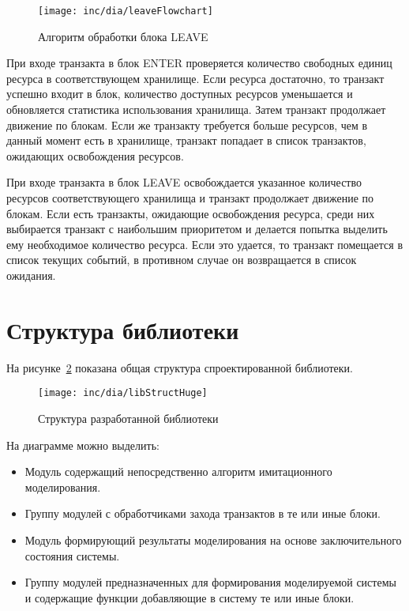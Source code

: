 \begin{figure}[ht!]
  \centering
  \texttt{[image: inc/dia/leaveFlowchart]}
  \caption{Алгоритм обработки блока LEAVE}
  \label{fig:leaveFlowchart}
\end{figure}

При входе транзакта в блок ENTER проверяется количество свободных единиц ресурса в соответствующем хранилище. Если ресурса достаточно, то транзакт успешно входит в блок, количество доступных ресурсов уменьшается и обновляется статистика использования хранилища. Затем транзакт продолжает движение по блокам. Если же транзакту требуется больше ресурсов, чем в данный момент есть в хранилище, транзакт попадает в список транзактов, ожидающих освобождения ресурсов.

При входе транзакта в блок LEAVE освобождается указанное количество ресурсов соответствующего хранилища и транзакт продолжает движение по блокам. Если есть транзакты, ожидающие освобождения ресурса, среди них выбирается транзакт с наибольшим приоритетом и делается попытка выделить ему необходимое количество ресурса. Если это удается, то транзакт помещается в список текущих событий, в противном случае он возвращается в список ожидания.

\section{Структура библиотеки}

На рисунке~\ref{fig:libStruct} показана общая структура спроектированной библиотеки.

\begin{figure}[ht!]
  \centering
  \texttt{[image: inc/dia/libStructHuge]}
  \caption{Структура разработанной библиотеки}
  \label{fig:libStruct}
\end{figure}

На диаграмме можно выделить:


\begin{itemize}
\item {Модуль содержащий непосредственно алгоритм имитационного моделирования.}
\item {Группу модулей с обработчиками захода транзактов в те или иные блоки.}
\item {Модуль формирующий результаты моделирования на основе заключительного состояния системы.}
\item {Группу модулей предназначенных для формирования моделируемой системы и содержащие функции добавляющие в систему те или иные блоки.}

\end{itemize}

